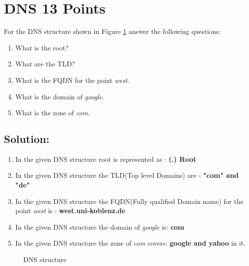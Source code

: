 \documentclass{resources/WeSTassignment}
\begin{document}
\section{DNS \hfill{13 Points}}
For the DNS structure shown in Figure \ref{fig:dns} answer the following questions:
\begin{enumerate}
    \item What is the root?
    \item What are the TLD?
    \item What is the FQDN for the point \emph{west}.
    \item What is the domain of \emph{google}.
    \item What is the zone of \emph{com}.
\end{enumerate}
\subsection{Solution:}
\begin{enumerate}
    \item In the given DNS structure root is represented as : \textbf{(.) Root}
    \item In the given DNS structure the TLD(Top level Domains) are - \textbf{"com" and "de"}
    \item In the given DNS structure the FQDN(Fully qualified Domain name) for the point \emph{west} is : \textbf{west.uni-koblenz.de}
    \item In the given DNS structure the domain of \emph{google} is: \textbf{com}
    \item In the given DNS structure the zone of \emph{com} covers: \textbf{google and yahoo} in it.
\end{enumerate}

\begin{figure}[h]
    \centering
   
    \caption{DNS structure}
    \label{fig:dns}
\end{figure}
\end{document}
